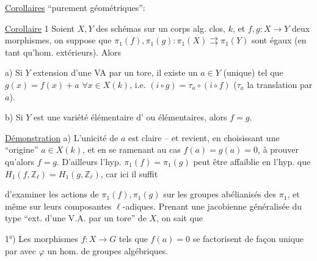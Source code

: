 \uline{Corollaires} ``purement géométriques'':

\uline{Corollaire} 1 Soient $X,Y$ des schémas  sur un corps alg. clos, $k$, et $f,g:X\longrightarrow Y$ deux morphismes, on suppose que $\pi_1(f),\pi_1(g):\pi_1(X)\rightrightarrows\pi_1(Y)$ sont égaux (en tant qu'hom. extérieurs). Alors

a) Si $Y$   extension d'une VA par un tore, il existe un $a\in Y$ (unique) tel que $g(x)=f(x)+a$ $\forall x\in X(k)$, i.e. $(i\circ g)=\tau_a\circ(i\circ f)$ ($\tau_a$ la translation par $a$).

b) Si $Y$ est une variété élémentaire d' ou    élémentaires,  alors $f=g$.


\uline{Démonstration} a) L'unicité de $a$ est claire -- et   revient,  en choisissant une ``origine'' $a\in X(k)$, et en se ramenant au cas $f(a)=g(a)=0$, à prouver qu'alors $f=g$. D'ailleurs l'hyp. $\pi_1(f)=\pi_1(g)$ peut être affaiblie en l'hyp. que  $H_1(f,\mathbb Z_\ell)=H_1(g,\mathbb Z_\ell)$,  car ici il suffit

d'examiner les actions de $\pi_1(f),\pi_1(g)$ sur les groupes abélianisés des $\pi_1$, et même sur leurs composantes $\ell$-adiques. Prenant une jacobienne généralisée du type ``ext. d'une V.A. par un tore'' de $X$, on sait que

1°) Les morphismes $f:X\longrightarrow G$ tels que $f(a)=0$ se factorisent de façon unique par
avec $\varphi$ un hom. de groupes algébriques.

